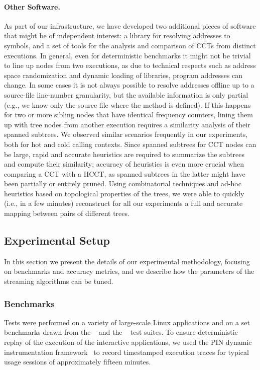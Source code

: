 \paragraph*{Other Software.} As part of our infrastructure, we have developed two additional pieces of software that might be of independent interest: a library for resolving addresses to symbols, and a set of tools for the analysis and comparison of CCTs from distinct executions. In general, even for deterministic benchmarks it might not be trivial to line up nodes from two executions, as due to technical respects such as address space randomization and dynamic loading of libraries, program addresses can change. In some cases it is not always possible to resolve addresses offline up to a source-file line-number granularity, but the available information is only partial (e.g., we know only the source file where the method is defined). If this happens for two or more sibling nodes that have identical frequency counters, lining them up with tree nodes from another execution requires a similarity analysis of their spanned subtrees. We observed similar scenarios frequently in our experiments, both for hot and cold calling contexts. Since spanned subtrees for CCT nodes can be large, rapid and accurate heuristics are required to summarize the subtrees and compute their similarity; accuracy of heuristics is even more crucial when comparing a CCT with a HCCT, as spanned subtrees in the latter might have been partially or entirely pruned. Using combinatorial techniques and ad-hoc heuristics based on topological properties of the trees, we were able to quickly (i.e., in a few minutes) reconstruct for all our experiments a full and accurate mapping between pairs of different trees.

\subsection{Experimental Setup}
\label{ss:hcct-experimental-setup}

In this section we present the details of our experimental methodology, focusing on benchmarks and accuracy metrics, and we describe how the parameters of the streaming algorithms can be tuned.

\subsubsection*{Benchmarks}
Tests were performed on a variety of large-scale Linux applications and on a set benchmarks drawn from the \phoronixpts~\cite{Henning06} and the \speccpu~\cite{Henning06} test suites. To ensure deterministic replay of the execution of the interactive applications, we used the PIN dynamic instrumentation framework~\cite{Luk05} to record timestamped execution traces for typical usage sessions of approximately fifteen minutes.

